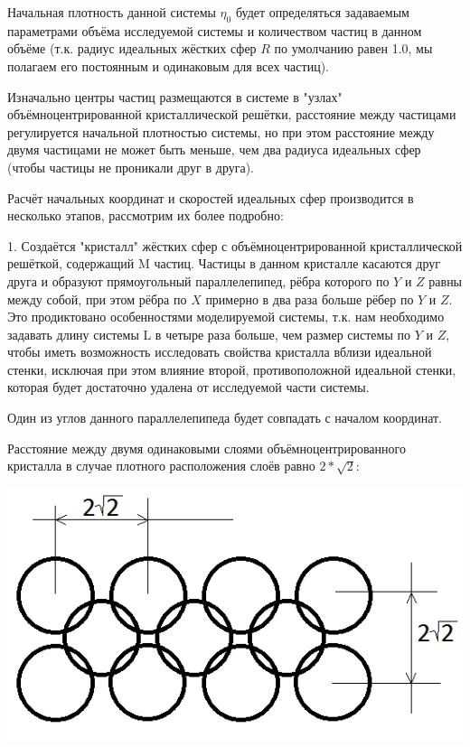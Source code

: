 \documentclass{article}
\begin{document}
Начальная плотность данной системы $ \eta_0 $ будет определяться задаваемым параметрами объёма исследуемой системы и количеством частиц в данном объёме (т.к. радиус идеальных жёстких сфер $R$ по умолчанию равен 1.0, мы полагаем его постоянным и одинаковым для всех частиц).

Изначально центры частиц размещаются в системе в "узлах" объёмноцентрированной кристаллической решётки, расстояние между частицами регулируется начальной плотностью системы, но при этом расстояние между двумя частицами не может быть меньше, чем два радиуса идеальных сфер (чтобы частицы не проникали друг в друга).

Расчёт начальных координат и скоростей идеальных сфер производится в несколько этапов, рассмотрим их более подробно:

1. Создаётся "кристалл" жёстких сфер с объёмноцентрированной кристаллической решёткой, содержащий M частиц. Частицы в данном кристалле касаются друг друга и образуют прямоугольный параллелепипед, рёбра которого по $ Y $ и $ Z $ равны между собой, при этом рёбра по $ X $ примерно в два раза больше рёбер по $ Y $ и $ Z $. Это продиктовано особенностями моделируемой системы, т.к. нам необходимо задавать длину системы L в четыре раза больше, чем размер системы по $ Y $ и $ Z $, чтобы иметь возможность исследовать свойства кристалла вблизи идеальной стенки, исключая при этом влияние второй, противоположной идеальной стенки, которая будет достаточно удалена от исследуемой части системы.

Один из углов данного параллелепипеда будет совпадать с началом координат.

Расстояние между двумя одинаковыми слоями объёмноцентрированного кристалла в случае плотного расположения слоёв равно $ 2*\sqrt{2} $:

\begin{center}
\includegraphics[scale=0.5]{distance_between_particles.png}
\end{center}
\end{document}
